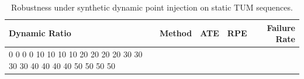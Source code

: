 \begin{table}[t]
\centering
\caption{Robustness under synthetic dynamic point injection on static TUM sequences.}
\label{tab:dynamic_ratio_robustness}
\begin{tabular}{lrrrr}
\toprule
Dynamic Ratio & Method & ATE & RPE & Failure Rate \\
\midrule
0%
0%
0%
0%
10%
10%
10%
10%
20%
20%
20%
20%
30%
30%
30%
30%
40%
40%
40%
40%
50%
50%
50%
50%
\bottomrule
\end{tabular}
\end{table}
